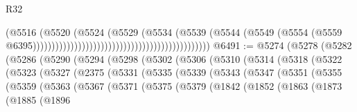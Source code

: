 \begin{lexlean}{R32}
\begin{coremodule}
                                                                              (@5516
                                                                                (@5520
                                                                                  (@5524
                                                                                    (@5529
                                                                                      (@5534
                                                                                        (@5539
                                                                                          (@5544
                                                                                            (@5549
                                                                                              (@5554
                                                                                                (@5559
                                                                                                  @6395)))))))))))))))))))))))))))))))))))))))))))))))
@6491 := @5274
    (@5278
      (@5282
        (@5286
          (@5290
            (@5294
              (@5298
                (@5302
                  (@5306
                    (@5310
                      (@5314
                        (@5318
                          (@5322
                            (@5323
                              (@5327
                                (@2375
                                  (@5331
                                    (@5335
                                      (@5339
                                        (@5343
                                          (@5347
                                            (@5351
                                              (@5355
                                                (@5359
                                                  (@5363
                                                    (@5367
                                                      (@5371
                                                        (@5375
                                                          (@5379
                                                            (@1842
                                                              (@1852
                                                                (@1863
                                                                  (@1873
                                                                    (@1885
                                                                      (@1896

\end{coremodule}
\end{lexlean}
